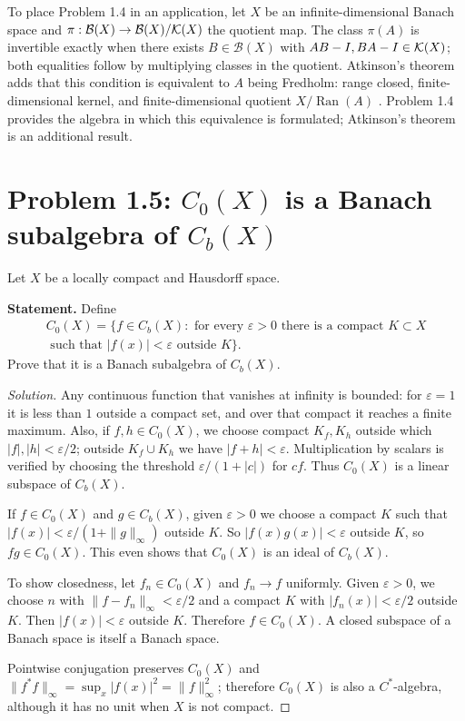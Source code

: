 \begin{investigacion}[title={Fredholm operators in the Calkin algebra}]
To place Problem 1.4 in an application, let $X$ be an infinite-dimensional Banach space and
$\pi:\mathcal B(X)\to\mathcal B(X)/\mathcal K(X)$ the quotient map.
The class $\pi(A)$ is invertible exactly when there exists $B\in\mathcal B(X)$ with
$AB-I,BA-I\in\mathcal K(X)$; both equalities follow by multiplying classes in the quotient.
Atkinson's theorem adds that this condition is equivalent to $A$ being Fredholm: range
closed, finite-dimensional kernel, and finite-dimensional quotient $X/\operatorname{Ran}(A)$
\cite[p.~2]{Karlovich2025}. Problem 1.4 provides the algebra in which this equivalence is formulated; Atkinson's theorem is an additional result.
\end{investigacion}

\section{Problem 1.5: \texorpdfstring{$C_0(X)$}{C0(X)} is a Banach subalgebra of \texorpdfstring{$C_b(X)$}{Cb(X)}}

Let $X$ be a locally compact and Hausdorff space.

\noindent\textbf{Statement.} Define
\begin{multline*}
C_0(X)=\{f\in C_b(X):\text{ for every }\varepsilon>0\text{ there is a compact }K\subset X\\
\text{ such that }|f(x)|<\varepsilon\text{ outside }K\}.
\end{multline*}
Prove that it is a Banach subalgebra of $C_b(X)$.

\begin{proof}[Solution]
Any continuous function that vanishes at infinity is bounded: for $\varepsilon=1$ it is less than $1$ outside a compact set, and over that compact it reaches a finite maximum.
Also, if $f,h\in C_0(X)$, we choose compact $K_f,K_h$ outside which
$|f|,|h|<\varepsilon/2$; outside $K_f\cup K_h$ we have $|f+h|<\varepsilon$.
Multiplication by scalars is verified by choosing the threshold
$\varepsilon/(1+|c|)$ for $cf$. Thus $C_0(X)$ is a linear subspace of $C_b(X)$.

If $f\in C_0(X)$ and $g\in C_b(X)$, given $\varepsilon>0$ we choose a compact $K$ such that
$|f(x)|<\varepsilon/(1+\|g\|_\infty)$ outside $K$. So
$|f(x)g(x)|<\varepsilon$ outside $K$, so $fg\in C_0(X)$. This even shows that $C_0(X)$
is an ideal of $C_b(X)$.

To show closedness, let $f_n\in C_0(X)$ and $f_n\to f$ uniformly. Given $\varepsilon>0$,
we choose $n$ with $\|f-f_n\|_\infty<\varepsilon/2$ and a compact $K$ with
$|f_n(x)|<\varepsilon/2$ outside $K$. Then $|f(x)|<\varepsilon$ outside $K$.
Therefore $f\in C_0(X)$. A closed subspace of a Banach space is itself a Banach space.

Pointwise conjugation preserves $C_0(X)$ and
$\|f^*f\|_\infty=\sup_x|f(x)|^2=\|f\|_\infty^2$; therefore $C_0(X)$ is also a
$C^*$-algebra, although it has no unit when $X$ is not compact.
\end{proof}

